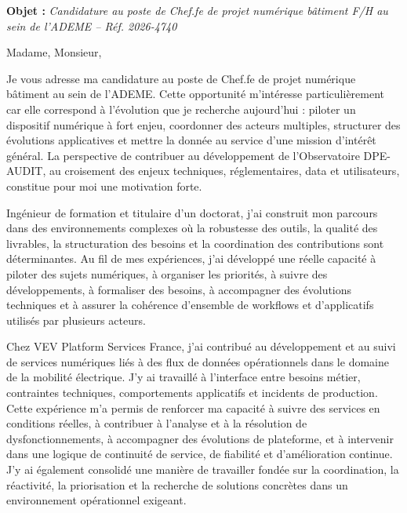 \documentclass[11pt,a4paper]{altacv}
\begin{document}
\makecvheader
\vspace{-0.6cm}
\vspace{-0.4cm}

{\color{accent}\textbf{Objet :}} \textit{Candidature au poste de Chef.fe de projet numérique bâtiment F/H au sein de l'ADEME -- Réf. 2026-4740}

{\color{body}

Madame, Monsieur,

Je vous adresse ma candidature au poste de Chef.fe de projet numérique bâtiment au sein de l'ADEME. Cette opportunité m'intéresse particulièrement car elle correspond à l'évolution que je recherche aujourd'hui : piloter un dispositif numérique à fort enjeu, coordonner des acteurs multiples, structurer des évolutions applicatives et mettre la donnée au service d'une mission d'intérêt général. La perspective de contribuer au développement de l'Observatoire DPE-AUDIT, au croisement des enjeux techniques, réglementaires, data et utilisateurs, constitue pour moi une motivation forte.

Ingénieur de formation et titulaire d'un doctorat, j'ai construit mon parcours dans des environnements complexes où la robustesse des outils, la qualité des livrables, la structuration des besoins et la coordination des contributions sont déterminantes. Au fil de mes expériences, j'ai développé une réelle capacité à piloter des sujets numériques, à organiser les priorités, à suivre des développements, à formaliser des besoins, à accompagner des évolutions techniques et à assurer la cohérence d'ensemble de workflows et d'applicatifs utilisés par plusieurs acteurs.

Chez VEV Platform Services France, j'ai contribué au développement et au suivi de services numériques liés à des flux de données opérationnels dans le domaine de la mobilité électrique. J'y ai travaillé à l'interface entre besoins métier, contraintes techniques, comportements applicatifs et incidents de production. Cette expérience m'a permis de renforcer ma capacité à suivre des services en conditions réelles, à contribuer à l'analyse et à la résolution de dysfonctionnements, à accompagner des évolutions de plateforme, et à intervenir dans une logique de continuité de service, de fiabilité et d'amélioration continue. J'y ai également consolidé une manière de travailler fondée sur la coordination, la réactivité, la priorisation et la recherche de solutions concrètes dans un environnement opérationnel exigeant.

}
\end{document}
